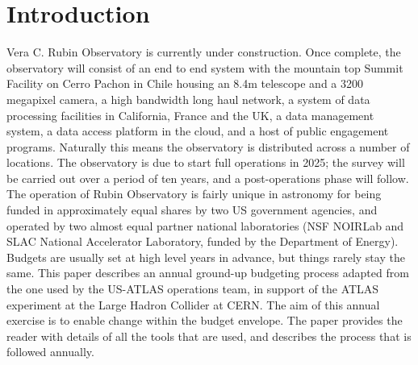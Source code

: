 \section{Introduction} \label{sec:intro}
Vera C. Rubin Observatory\cite{2008arXiv0805.2366I} is currently under construction. 
Once complete, the observatory will consist of an end to end system with the mountain top Summit Facility on Cerro Pachon in Chile housing an 8.4m telescope and a 3200 megapixel camera, a high bandwidth long haul network, a system of data processing facilities in California, France and the UK, a data management system, a data access platform in the cloud, and a host of public engagement programs. 
Naturally this means the observatory is distributed across a number of locations. 
The observatory is due to start full operations in 2025; the survey will be carried out over a period of ten years, and a post-operations phase will follow. 
The operation of Rubin Observatory is fairly unique in astronomy for being funded in approximately equal shares by two US government agencies, and operated by two almost equal partner national laboratories (NSF NOIRLab and SLAC National Accelerator Laboratory, funded by the Department of Energy). 
Budgets are usually set at high level years in advance, but things rarely stay the same.
This paper describes an annual ground-up budgeting process adapted from the one used by the US-ATLAS operations team, in support of the ATLAS experiment at the Large Hadron Collider at CERN. 
The aim of this annual exercise is to enable change within the budget envelope.
The paper provides the reader with details of all the tools that are used, and describes the process that is followed annually.
